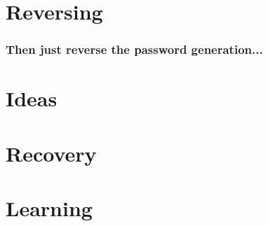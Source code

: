 \documentclass[12pt,a4paper]{beamer}
\begin{document}
\section{Reversing}

\begin{frame}
\frametitle{Then just reverse the password generation...}

\end{frame}

\section{Ideas}

\section{Recovery}


\section{Learning}
\end{document}
